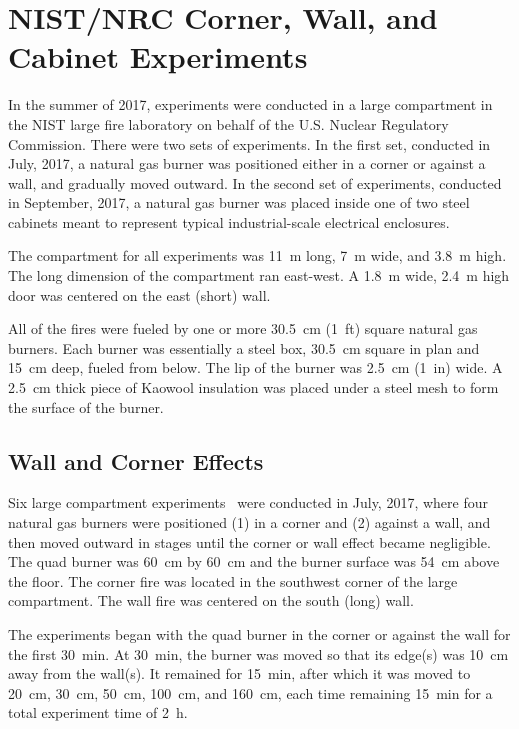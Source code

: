 \FloatBarrier

\section{NIST/NRC Corner, Wall, and Cabinet Experiments}
\label{NIST_NRC_Corner_Wall_Cabinet_Description}

In the summer of 2017, experiments were conducted in a large compartment in the NIST large fire laboratory on behalf of the U.S. Nuclear Regulatory Commission. There were two sets of experiments. In the first set, conducted in July, 2017, a natural gas burner was positioned either in a corner or against a wall, and gradually moved outward. In the second set of experiments, conducted in September, 2017, a natural gas burner was placed inside one of two steel cabinets meant to represent typical industrial-scale electrical enclosures.

The compartment for all experiments was 11~m long, 7~m wide, and 3.8~m high. The long dimension of the compartment ran east-west. A 1.8~m wide, 2.4~m high door was centered on the east (short) wall.

All of the fires were fueled by one or more 30.5~cm (1~ft) square natural gas burners. Each burner was essentially a steel box, 30.5~cm square in plan and 15~cm deep, fueled from below. The lip of the burner was 2.5~cm (1~in) wide. A 2.5~cm thick piece of Kaowool insulation was placed under a steel mesh to form the surface of the burner.

\subsection{Wall and Corner Effects}

Six large compartment experiments~\cite{McGrattan:TN1984} were conducted in July, 2017, where four natural gas burners were positioned (1) in a corner and (2) against a wall, and then moved outward in stages until the corner or wall effect became negligible. The quad burner was 60~cm by 60~cm and the burner surface was 54~cm above the floor. The corner fire was located in the southwest corner of the large compartment. The wall fire was centered on the south (long) wall.

The experiments began with the quad burner in the corner or against the wall for the first 30~min. At 30~min, the burner was moved so that its edge(s) was 10~cm away from the wall(s). It remained for 15~min, after which it was moved to 20~cm, 30~cm, 50~cm, 100~cm, and 160~cm, each time remaining 15~min for a total experiment time of 2~h.

